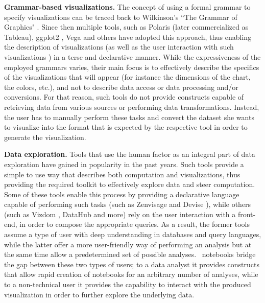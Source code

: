 {\bf Grammar-based visualizations.} The concept of using a formal grammar to specify visualizations can be traced back to Wilkinson's ``The Grammar of Graphics" \cite{Wilkinson:2005:GG:1088896}. Since then multiple tools, such as Polaris \cite{stolte2002polaris} (later commercialized as Tableau), ggplot2 \cite{wickham2009ggplot2}, Vega \cite{satyanarayan2015vega, vega} and others \cite{ggvis, bostock2009protovis, d3} have adopted this approach, thus enabling the description of visualizations (as well as the user interaction with such visualizations \cite{Wu:2016:DAI:2939502.2939517, satyanarayan2016reactive}) in a terse and declarative manner. While the expressiveness of the employed grammars varies, their main focus is to effectively describe the specifics of the visualizations that will appear (for instance the dimensions of the chart, the colors, etc.), and not to describe data access or data processing and/or conversions. For that reason, such tools do not provide constructs capable of retrieving data from various sources or performing data transformations. Instead, the user has to manually perform these tasks and convert the dataset she wants to visualize into the format that is expected by the respective tool in order to generate the visualization.


{\bf Data exploration.}  Tools that use the human factor as an integral part of data exploration have gained in popularity in the past years. Such tools provide a simple to use way that describes both computation and visualizations, thus providing the required toolkit to effectively explore data and steer computation. Some of these tools enable this process by providing a declarative language capable of performing such tasks (such as Zenvisage \cite{DBLP:journals/corr/SiddiquiKLKP16} and Devise \cite{livny1997devise}), while others (such as Vizdom \cite{crotty2015vizdom}, DataHub \cite{Krishnan:2016:AID:2994509.2994514} and more\cite{derthick1997interactive,  bhardwaj2015collaborative, zoumpatianos2015rinse, DBLP:conf/icde/LiarouI14, Kamat:2016:TSI:2939502.2939514}) rely on the user interaction with a front-end, in order to compose the appropriate queries. As a result, the former tools assume a type of user with deep understanding in databases and query languages, while the latter offer a more user-friendly way of performing an analysis but at the same time allow a predetermined set of possible analyses. \projname\ notebooks bridge the gap between these two types of users; to a data analyst it provides constructs that allow rapid creation of notebooks for an arbitrary number of analyses, while to a non-technical user it provides the capability to interact with the produced visualization in order to further explore the underlying data.



